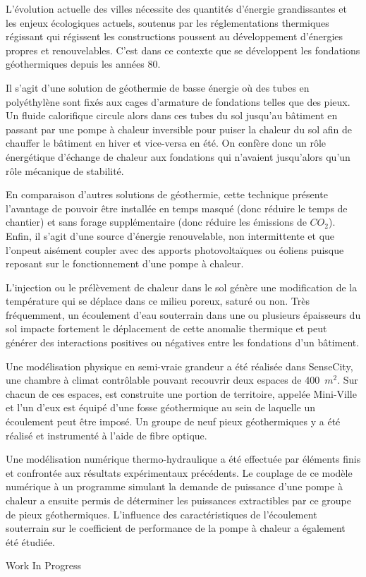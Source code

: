 {\normalsize
L'évolution actuelle des villes nécessite des quantités d'énergie grandissantes et les enjeux écologiques actuels, soutenus par les réglementations thermiques régissant qui régissent les constructions poussent au développement d'énergies propres et renouvelables. C'est dans ce contexte que se développent les fondations géothermiques depuis les années 80.



Il s'agit d'une solution de géothermie de basse énergie où des tubes en polyéthylène sont fixés aux cages d'armature de fondations telles que des pieux. Un fluide calorifique circule alors dans ces tubes du sol jusqu'au bâtiment en passant par une pompe à chaleur inversible pour puiser la chaleur du sol afin de chauffer le bâtiment en hiver et vice-versa en été. On confère donc un rôle énergétique d'échange de chaleur aux fondations qui n'avaient jusqu'alors qu'un rôle mécanique de stabilité.



En comparaison d'autres solutions de géothermie, cette technique présente l'avantage de pouvoir être installée en temps masqué (donc réduire le temps de chantier) et sans forage supplémentaire (donc réduire les émissions de $\unit{CO_2}$). Enfin, il s'agit d'une source d'énergie renouvelable, non intermittente et que l'onpeut aisément coupler avec des apports photovoltaïques ou éoliens puisque reposant sur le fonctionnement d'une pompe à chaleur.



L'injection ou le prélèvement de chaleur dans le sol génère une modification de la température qui se déplace dans ce milieu poreux, saturé ou non. Très fréquemment, un écoulement d'eau souterrain dans une ou plusieurs épaisseurs du sol impacte fortement le déplacement de cette anomalie thermique et peut générer des interactions positives ou négatives entre les fondations d'un bâtiment. 



Une modélisation physique en semi-vraie grandeur a été réalisée dans SenseCity, une chambre à climat contrôlable pouvant recouvrir deux espaces de 400~$\unit{m^2}$. Sur chacun de ces espaces, est construite une portion de territoire, appelée Mini-Ville et l'un d'eux est équipé d'une fosse géothermique au sein de laquelle un écoulement peut être imposé. Un groupe de neuf pieux géothermiques y a été réalisé et instrumenté à l'aide de fibre optique.



Une modélisation numérique thermo-hydraulique a été effectuée par éléments finis et confrontée aux résultats expérimentaux précédents. Le couplage de ce modèle numérique à un programme simulant la demande de puissance d'une pompe à chaleur a ensuite permis de déterminer les puissances extractibles par ce groupe de pieux géothermiques. L'influence des caractéristiques de l'écoulement souterrain sur le coefficient de performance de la pompe à chaleur a également été étudiée.

 \vfill Work In Progress

}
 
